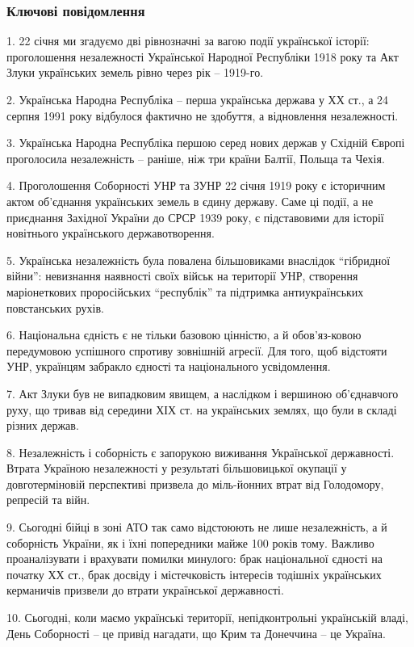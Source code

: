  
 
 
 
 

\subsubsection{Ключові повідомлення}

1. 22 січня ми згадуємо дві рівнозначні за вагою події української історії:
проголошення незалежності Української Народної Республіки 1918 року та Акт
Злуки українських земель рівно через рік – 1919-го.

2. Українська Народна Республіка – перша українська держава у ХХ ст., а 24
серпня 1991 року відбулося фактично не здобуття, а відновлення незалежності.

3. Українська Народна Республіка першою серед нових держав у Східній Європі
проголосила незалежність – раніше, ніж три країни Балтії, Польща та Чехія.

4. Проголошення Соборності УНР та ЗУНР 22 січня 1919 року є історичним актом
об'єднання українських земель в єдину державу. Саме ці події, а не приєднання
Західної України до СРСР 1939 року, є підставовими для історії новітнього
українського державотворення.

5. Українська незалежність була повалена більшовиками внаслідок \enquote{гібридної
війни}: невизнання наявності своїх військ на території УНР, створення
маріонеткових проросійських \enquote{республік} та підтримка антиукраїнських
повстанських рухів.

6. Національна єдність є не тільки базовою цінністю, а й обов'яз\hyp{}ковою
передумовою успішного спротиву зовнішній агресії. Для того, щоб відстояти УНР,
українцям забракло єдності та національного усвідомлення.

7. Акт Злуки був не випадковим явищем, а наслідком і вершиною об'єднавчого
руху, що тривав від середини ХІХ ст. на українських землях, що були в складі
різних держав.

8. Незалежність і соборність є запорукою виживання Української державності.
Втрата Україною незалежності у результаті більшовицької окупації у
довготерміновій перспективі призвела до міль\hyp{}йонних втрат від Голодомору,
репресій та війн.

9. Сьогодні бійці в зоні АТО так само відстоюють не лише незалежність, а й
соборність України, як і їхні попередники майже 100 років тому. Важливо
проаналізувати і врахувати помилки минулого: брак національної єдності на
початку ХХ ст., брак досвіду і містечковість інтересів тодішніх українських
керманичів призвели до втрати української державності.

10. Сьогодні, коли маємо українські території, непідконтрольні українській
владі, День Соборності – це привід нагадати, що Крим та Донеччина – це Україна.
